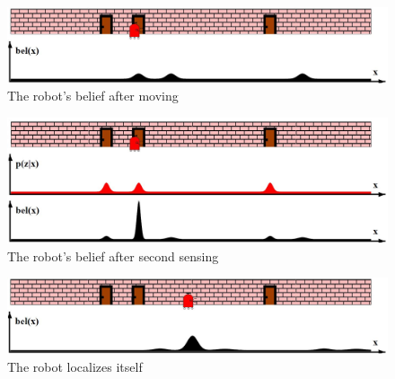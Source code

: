 \begin{figure}[h]
\centering
\includegraphics[scale=0.37]{images/MarkovLocalizationC}
\caption{The robot's belief after moving}
\label{fig:afterMoveBelief}
\end{figure}

\begin{figure}[h]
\centering
\includegraphics[scale=0.37]{images/MarkovLocalizationD}
\caption{The robot's belief after second sensing}
\label{fig:afterSecondSenseBelief}
\end{figure}

\begin{figure}[h]
\centering
\includegraphics[scale=0.37]{images/MarkovLocalizationE}
\caption{The robot localizes itself}
\label{fig:finalBelief}
\end{figure}